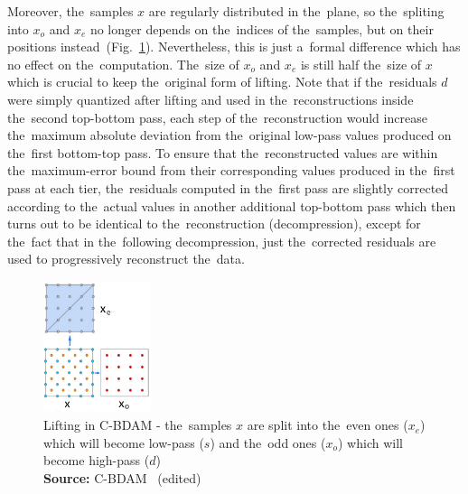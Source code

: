 Moreover, the~samples $x$ are regularly distributed in the~plane, so the~spliting into $x_o$ and $x_e$ no longer depends on the~indices of the~samples, but on their positions instead~(Fig.~\ref{fig:cbdam_lifting}). Nevertheless, this is just a~formal difference which has no effect on the~computation. The~size of $x_o$ and $x_e$ is still half the~size of $x$ which is crucial to keep the~original form of lifting. Note that if the~residuals $d$ were simply quantized after lifting and used in the~reconstructions inside the~second top-bottom pass, each step of the~reconstruction would increase the~maximum absolute deviation from the~original low-pass values produced on the~first bottom-top pass. To ensure that the~reconstructed values are within the~maximum-error bound from their corresponding values produced in the~first pass at each tier, the~residuals computed in the~first pass are slightly corrected according to the~actual values in another additional top-bottom pass which then turns out to be identical to the~reconstruction (decompression), except for the~fact that in the~following decompression, just the~corrected residuals are used to progressively reconstruct the~data.

\newcommand*{\captionsource}[2]{%
	\caption[{#1}]{%
		#1%
		\\\hspace{\linewidth}%
		\textbf{Source:} #2%
	}%
}

\begin{figure}
	\includegraphics[width=0.28\textwidth]{figures/cbdam_lifting.png}\centering
	\captionsource{Lifting in C-BDAM - the~samples $x$ are split into the~even ones ($x_e$) which will become low-pass ($s$) and the~odd ones ($x_o$) which will become high-pass ($d$)}{C-BDAM~\cite{cbdam} (edited)}
	\label{fig:cbdam_lifting}
\end{figure}

